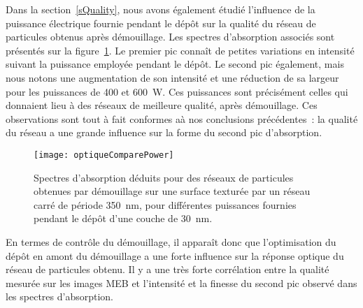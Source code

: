 Dans la section~\ref{sQuality}, nous avons également étudié l'influence de la puissance électrique fournie pendant le dépôt sur la qualité du réseau de particules obtenus après démouillage. Les spectres d'absorption associés sont présentés sur la figure~\ref{optiqueComparePower}. Le premier pic connaît de petites variations en intensité suivant la puissance employée pendant le dépôt. Le second pic également, mais nous notons une augmentation de son intensité et une réduction de sa largeur pour les puissances de 400 et 600~W. Ces puissances sont précisément celles qui donnaient lieu à des réseaux de meilleure qualité, après démouillage. Ces observations sont tout à fait conformes aà nos conclusions précédentes~: la qualité du réseau a une grande influence sur la forme du second pic d'absorption.\par  
\begin{figure}[!htb]
\centering
\texttt{[image: optiqueComparePower]}
\caption{Spectres d'absorption déduits pour des réseaux de particules obtenues par démouillage sur une surface texturée par un réseau carré de période 350~nm, pour différentes puissances fournies pendant le dépôt d'une couche de 30~nm.}
\label{optiqueComparePower}
\end{figure}
En termes de contrôle du démouillage, il apparaît donc que l'optimisation du dépôt en amont du démouillage a une forte influence sur la réponse optique du réseau de particules obtenu. Il y a une très forte corrélation entre la qualité mesurée sur les images MEB et l'intensité et la finesse du second pic observé dans les spectres d'absorption.\par 
